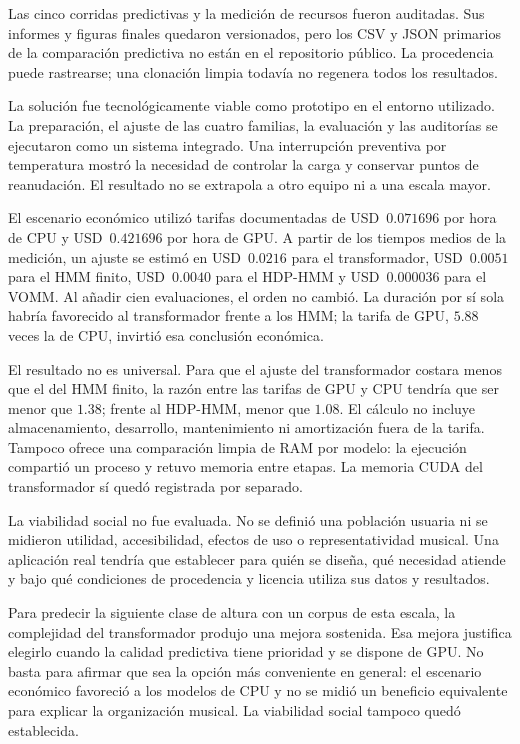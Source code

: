 Las cinco corridas predictivas y la medición de recursos fueron auditadas. Sus informes y figuras finales quedaron versionados, pero los CSV y JSON primarios de la comparación predictiva no están en el repositorio público. La procedencia puede rastrearse; una clonación limpia todavía no regenera todos los resultados.

La solución fue tecnológicamente viable como prototipo en el entorno utilizado. La preparación, el ajuste de las cuatro familias, la evaluación y las auditorías se ejecutaron como un sistema integrado. Una interrupción preventiva por temperatura mostró la necesidad de controlar la carga y conservar puntos de reanudación. El resultado no se extrapola a otro equipo ni a una escala mayor.

El escenario económico utilizó tarifas documentadas de USD~$0.071696$ por hora de CPU y USD~$0.421696$ por hora de GPU. A partir de los tiempos medios de la medición, un ajuste se estimó en USD~$0.0216$ para el transformador, USD~$0.0051$ para el HMM finito, USD~$0.0040$ para el HDP-HMM y USD~$0.000036$ para el VOMM. Al añadir cien evaluaciones, el orden no cambió. La duración por sí sola habría favorecido al transformador frente a los HMM; la tarifa de GPU, $5.88$ veces la de CPU, invirtió esa conclusión económica.

El resultado no es universal. Para que el ajuste del transformador costara menos que el del HMM finito, la razón entre las tarifas de GPU y CPU tendría que ser menor que $1.38$; frente al HDP-HMM, menor que $1.08$. El cálculo no incluye almacenamiento, desarrollo, mantenimiento ni amortización fuera de la tarifa. Tampoco ofrece una comparación limpia de RAM por modelo: la ejecución compartió un proceso y retuvo memoria entre etapas. La memoria CUDA del transformador sí quedó registrada por separado.

La viabilidad social no fue evaluada. No se definió una población usuaria ni se midieron utilidad, accesibilidad, efectos de uso o representatividad musical. Una aplicación real tendría que establecer para quién se diseña, qué necesidad atiende y bajo qué condiciones de procedencia y licencia utiliza sus datos y resultados.

Para predecir la siguiente clase de altura con un corpus de esta escala, la complejidad del transformador produjo una mejora sostenida. Esa mejora justifica elegirlo cuando la calidad predictiva tiene prioridad y se dispone de GPU. No basta para afirmar que sea la opción más conveniente en general: el escenario económico favoreció a los modelos de CPU y no se midió un beneficio equivalente para explicar la organización musical. La viabilidad social tampoco quedó establecida.

